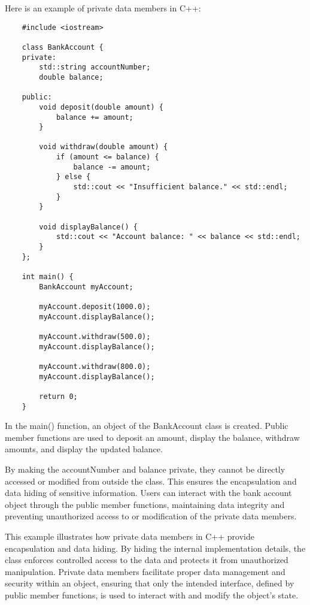 \begin{solution}
    Here is an example of private data members in C++: \\
    \horizontalline
    \begin{verbatim}
    #include <iostream>

    class BankAccount {
    private:
        std::string accountNumber;
        double balance;
        
    public:
        void deposit(double amount) {
            balance += amount;
        }
        
        void withdraw(double amount) {
            if (amount <= balance) {
                balance -= amount;
            } else {
                std::cout << "Insufficient balance." << std::endl;
            }
        }
        
        void displayBalance() {
            std::cout << "Account balance: " << balance << std::endl;
        }
    };
    
    int main() {
        BankAccount myAccount;
        
        myAccount.deposit(1000.0);
        myAccount.displayBalance();
        
        myAccount.withdraw(500.0);
        myAccount.displayBalance();
        
        myAccount.withdraw(800.0);
        myAccount.displayBalance();
        
        return 0;
    }
    \end{verbatim}
    
    \horizontalline

    In the main() function, an object of the BankAccount class is created. Public member functions are used to deposit an amount, display the balance, withdraw amounts, and display the updated balance.

    \noindent By making the accountNumber and balance private, they cannot be directly accessed or modified from outside the class. This ensures the encapsulation and data hiding of sensitive information. 
    Users can interact with the bank account object through the public member functions, maintaining data integrity and preventing unauthorized access to or modification of the private data members.

    \noindent This example illustrates how private data members in C++ provide encapsulation and data hiding. By hiding the internal implementation details, the class enforces controlled access to the data 
    and protects it from unauthorized manipulation. Private data members facilitate proper data management and security within an object, ensuring that only the intended interface, defined by public member 
    functions, is used to interact with and modify the object's state.
\end{solution}

